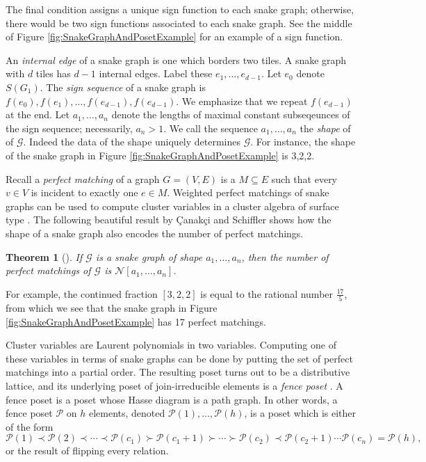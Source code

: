 \documentclass[12pt, letterpaper,table]{amsart}
\newtheorem{theorem}{Theorem}
\theoremstyle{remark}
\newcommand{\calP}{\mathcal{P}}
\newcommand{\canakci}{{\c{C}}anak{\c{c}}i }
\begin{document}
The final condition assigns a unique sign function to each snake graph; otherwise, there would be two sign functions associated to each snake graph. See the middle of Figure \ref{fig:SnakeGraphAndPosetExample} for an example of a sign function.

An \emph{internal edge} of a snake graph is one which borders two tiles. A snake graph with $d$ tiles has $d-1$ internal edges. Label these $e_1,\ldots,e_{d-1}$. Let $e_0$ denote $S(G_1)$. The \emph{sign sequence} of a snake graph is $f(e_0),f(e_1),\ldots,f(e_{d-1}),f(e_{d-1})$. We emphasize that we repeat $f(e_{d-1})$ at the end. Let $a_1,\ldots,a_n$ denote the lengths of maximal constant subseqeunces of the sign sequence; necessarily, $a_n > 1$. We call the sequence $a_1,\ldots,a_n$ the \emph{shape} of of $\mathcal{G}$. Indeed the data of the shape uniquely determines $\mathcal{G}$. For instance, the shape of the snake graph in Figure \ref{fig:SnakeGraphAndPosetExample} is 3,2,2.

Recall a \emph{perfect matching} of a graph $G = (V,E)$ is a $M \subseteq E$ such that every $v \in V$ is incident to exactly one $e \in M$. Weighted perfect matchings of snake graphs can be used to compute cluster variables in a cluster algebra of surface type \cite{musiker2011positivity}. The following beautiful result by \canakci and Schiffler shows how the shape of a snake graph also encodes the number of perfect matchings. 

\begin{theorem}[\cite{CSContFrac}]\label{thm:CountPMSWithContFrac}
If $\mathcal{G}$ is a snake graph of shape $a_1,\ldots,a_n$, then the number of perfect matchings of  $\mathcal{G}$ is $\mathcal{N}[a_1,\ldots,a_n]$.
\end{theorem}

For example, the continued fraction $[3,2,2]$ is equal to the rational number $\frac{17}{5}$, from which we see that the snake graph in Figure \ref{fig:SnakeGraphAndPosetExample} has 17 perfect matchings.

Cluster variables are Laurent polynomials in two variables. Computing one of these variables in terms of snake graphs can be done by putting the set of perfect matchings into a partial order. The resulting poset turns out to be a distributive lattice, and its underlying poset of join-irreducible elements is a \emph{fence poset} \cite[Theorem 5.4]{musiker2013bases}. A fence poset is a poset whose Hasse diagram is a path graph. In other words, a fence poset $\calP$ on $h$ elements, denoted $\calP(1),\ldots,\calP(h)$, is a poset which is either of the form \begin{equation}\calP(1)\prec \calP(2) \prec \cdots \prec \calP(c_1) \succ \calP(c_1 + 1) \succ \cdots \succ \calP(c_2) \prec \calP(c_2+1 )\cdots \calP(c_n) = \calP(h),\label{eq:FencePosetDef} \end{equation}
or the result of flipping every relation.
\end{document}
